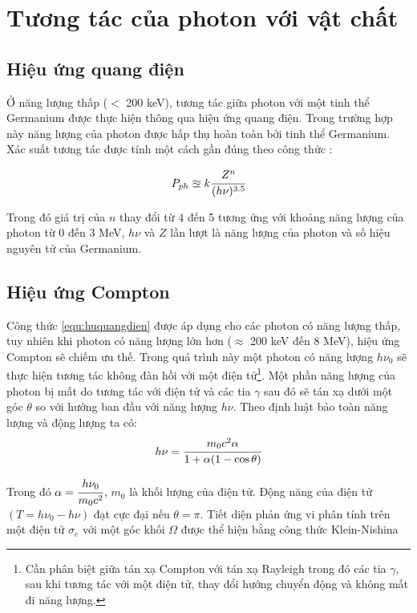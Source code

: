 \chapter{Tương tác của photon với vật chất}
\label{ch:cosolythuyet}
\section{Hiệu ứng quang điện}
Ở năng lượng thấp ($<$ 200 keV), tương tác giữa photon với một tinh thể Germanium được thực hiện thông qua hiệu ứng quang điện. Trong trường hợp này năng lượng của photon được hấp thụ hoàn toàn bởi tinh thể Germanium. Xác suất tương tác được tính một cách gần đúng theo công thức \cite{bib_Knoll}:

\begin{equation} 
P_{ph}\approxeq k\cfrac{Z^{n}}{(h\nu)^{3.5}}
\label{equ:huquangdien}
\end{equation}

Trong đó giá trị của $n$ thay đổi từ 4 đến 5 tương ứng với khoảng năng lượng của photon từ 0 đến 3 MeV, $h\nu$ và $Z$ lần lượt là năng lượng của photon và số hiệu nguyên tử của Germanium.

\section{Hiệu ứng Compton}

Công thức \ref{equ:huquangdien} được áp dụng cho các photon có năng lượng thấp, tuy nhiên khi photon có năng lượng lớn hơn ($\approx$ 200 keV đến 8 MeV), hiệu ứng Compton sẽ chiếm ưu thế. Trong quá trình này một photon có năng lượng $h\nu_{0}$ sẽ thực hiện tương tác không đàn hồi với một điện tử\footnote{Cần phân biệt giữa tán xạ Compton với tán xạ Rayleigh trong đó các tia $\gamma$, sau khi tương tác với một điện tử, thay đổi hướng chuyển động và không mất đi năng lượng.}. Một phần năng lượng của photon bị mất do tương tác với điện tử và các tia $\gamma$ sau đó sẽ tán xạ dưới một góc $\theta$ so với hướng ban đầu với năng lượng $h\nu$. Theo định luật bảo toàn năng lượng và động lượng ta có: 
%
\begin{equation}
h\nu=\cfrac{m_{0}c^{2}\alpha}{1+\alpha(1-\cos{\theta})}
\end{equation}

Trong đó $\alpha=\cfrac{h\nu_{0}}{m_{0}c^{2}}$, $m_{0}$ là khối lượng của điện tử. Động năng của điện tử $(T=h\nu_{0}-h\nu)$ đạt cực đại nếu $\theta=\pi$. Tiết diện phản ứng vi phân tính trên một điện tử $\sigma_{e}$ với một góc khối $\Omega$ được thể hiện bằng công thức Klein-Nishina\cite{bib_Klein}

